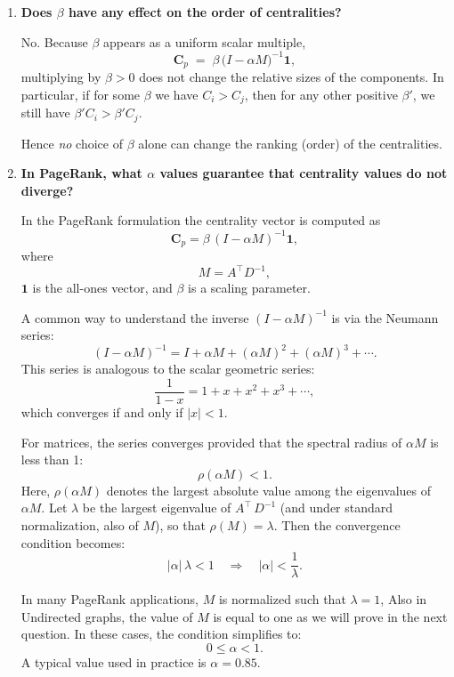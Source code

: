 \documentclass[a4paper,12pt]{article}
\begin{document}
\begin{enumerate}
Similarly for this problem, we can see that $\beta$ does not affect the order of centralities.  However, $\alpha$ does affect the order, as we saw in the previous part.

\bigskip

\item \textbf{Does $\beta$ have any effect on the order of centralities?}

No.  Because $\beta$ appears as a uniform scalar multiple, 
\[
\mathbf{C}_p \;=\; \beta \,\bigl(I-\alpha M\bigr)^{-1}\mathbf{1},
\]
multiplying by $\beta>0$ does not change the relative sizes of the components.  In particular, if for some $\beta$ we have $C_i > C_j$, then for any other positive $\beta'$, we still have $\beta' C_i > \beta' C_j$.  

Hence \emph{no} choice of $\beta$ alone can change the ranking (order) of the centralities.

\bigskip

\item \textbf{In PageRank, what \(\alpha\) values guarantee that centrality values do not diverge?}

In the PageRank formulation the centrality vector is computed as
\[
\mathbf{C}_p = \beta \,(I - \alpha M)^{-1}\mathbf{1},
\]
where
\[
M = A^\top D^{-1},
\]
\(\mathbf{1}\) is the all-ones vector, and \(\beta\) is a scaling parameter.

A common way to understand the inverse \((I - \alpha M)^{-1}\) is via the Neumann series:
\[
(I - \alpha M)^{-1} = I + \alpha M + (\alpha M)^2 + (\alpha M)^3 + \cdots.
\]
This series is analogous to the scalar geometric series:
\[
\frac{1}{1-x} = 1 + x + x^2 + x^3 + \cdots,
\]
which converges if and only if \(|x| < 1\).

For matrices, the series converges provided that the spectral radius of \(\alpha M\) is less than 1:
\[
\rho(\alpha M) < 1.
\]
Here, \(\rho(\alpha M)\) denotes the largest absolute value among the eigenvalues of \(\alpha M\). Let \(\lambda\) be the largest eigenvalue of \(A^\top \,D^{-1}\) (and under standard normalization, also of \(M\)), so that \(\rho(M) = \lambda\). Then the convergence condition becomes:
\[
|\alpha| \,\lambda < 1 \quad \Longrightarrow \quad |\alpha| < \frac{1}{\lambda}.
\]

In many PageRank applications, \(M\) is normalized such that \(\lambda = 1\), Also in Undirected graphs, the value of \(M\) is equal to one as we will prove in the next question. In these cases, the condition simplifies to:
\[
0 \le \alpha < 1.
\]
A typical value used in practice is \(\alpha = 0.85\).


\end{enumerate}
\end{document}
